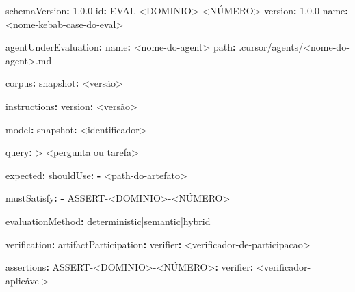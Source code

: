 \documentclass[
  10pt,
  a4paper,
  oneside]{book}
\newenvironment{Shaded}{}{}
\newcommand{\AttributeTok}[1]{\textcolor[rgb]{0.49,0.56,0.16}{#1}}
\newcommand{\CharTok}[1]{\textcolor[rgb]{0.25,0.44,0.63}{#1}}
\newcommand{\FloatTok}[1]{\textcolor[rgb]{0.25,0.63,0.44}{#1}}
\newcommand{\FunctionTok}[1]{\textcolor[rgb]{0.02,0.16,0.49}{#1}}
\newcommand{\KeywordTok}[1]{\textcolor[rgb]{0.00,0.44,0.13}{\textbf{#1}}}
\newcommand{\NormalTok}[1]{#1}
\renewenvironment{Shaded}{\begin{snugshade}}{\end{snugshade}}%
\begin{document}
\begin{Shaded}
\begin{Highlighting}[]
\FunctionTok{schemaVersion}\KeywordTok{:}\AttributeTok{ }\FloatTok{1.0.0}
\FunctionTok{id}\KeywordTok{:}\AttributeTok{ EVAL{-}\textless{}DOMINIO\textgreater{}{-}\textless{}NÚMERO\textgreater{}}
\FunctionTok{version}\KeywordTok{:}\AttributeTok{ }\FloatTok{1.0.0}
\FunctionTok{name}\KeywordTok{:}\AttributeTok{ \textless{}nome{-}kebab{-}case{-}do{-}eval\textgreater{}}

\FunctionTok{agentUnderEvaluation}\KeywordTok{:}
\AttributeTok{  }\FunctionTok{name}\KeywordTok{:}\AttributeTok{ \textless{}nome{-}do{-}agent\textgreater{}}
\AttributeTok{  }\FunctionTok{path}\KeywordTok{:}\AttributeTok{ .cursor/agents/\textless{}nome{-}do{-}agent\textgreater{}.md}

\FunctionTok{corpus}\KeywordTok{:}
\AttributeTok{  }\FunctionTok{snapshot}\KeywordTok{:}\AttributeTok{ \textless{}versão\textgreater{}}

\FunctionTok{instructions}\KeywordTok{:}
\AttributeTok{  }\FunctionTok{version}\KeywordTok{:}\AttributeTok{ \textless{}versão\textgreater{}}

\FunctionTok{model}\KeywordTok{:}
\AttributeTok{  }\FunctionTok{snapshot}\KeywordTok{:}\AttributeTok{ \textless{}identificador\textgreater{}}

\FunctionTok{query}\KeywordTok{: }\CharTok{\textgreater{}}
\NormalTok{  \textless{}pergunta ou tarefa\textgreater{}}

\FunctionTok{expected}\KeywordTok{:}
\AttributeTok{  }\FunctionTok{shouldUse}\KeywordTok{:}
\AttributeTok{    }\KeywordTok{{-}}\AttributeTok{ \textless{}path{-}do{-}artefato\textgreater{}}

\AttributeTok{  }\FunctionTok{mustSatisfy}\KeywordTok{:}
\AttributeTok{    }\KeywordTok{{-}}\AttributeTok{ ASSERT{-}\textless{}DOMINIO\textgreater{}{-}\textless{}NÚMERO\textgreater{}}

\FunctionTok{evaluationMethod}\KeywordTok{:}\AttributeTok{ deterministic|semantic|hybrid}

\FunctionTok{verification}\KeywordTok{:}
\AttributeTok{  }\FunctionTok{artifactParticipation}\KeywordTok{:}
\AttributeTok{    }\FunctionTok{verifier}\KeywordTok{:}\AttributeTok{ \textless{}verificador{-}de{-}participacao\textgreater{}}

\AttributeTok{  }\FunctionTok{assertions}\KeywordTok{:}
\AttributeTok{    }\FunctionTok{ASSERT{-}\textless{}DOMINIO\textgreater{}{-}\textless{}NÚMERO\textgreater{}}\KeywordTok{:}
\AttributeTok{      }\FunctionTok{verifier}\KeywordTok{:}\AttributeTok{ \textless{}verificador{-}aplicável\textgreater{}}
\end{Highlighting}
\end{Shaded}
\end{document}
